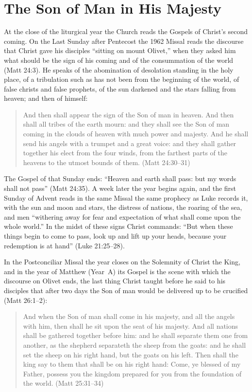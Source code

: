 \section{The Son of Man in His Majesty}\label{sec:majesty}

At the close of the liturgical year the Church reads the Gospels of Christ's second coming. On the Last Sunday after Pentecost the 1962 Missal reads the discourse that Christ gave his disciples ``sitting on mount Olivet,'' when they asked him what should be the sign of his coming and of the consummation of the world (Matt 24:3). He speaks of the abomination of desolation standing in the holy place, of a tribulation such as has not been from the beginning of the world, of false christs and false prophets, of the sun darkened and the stars falling from heaven; and then of himself:

\begin{quote}
And then shall appear the sign of the Son of man in heaven. And then shall all tribes of the earth mourn: and they shall see the Son of man coming in the clouds of heaven with much power and majesty. And he shall send his angels with a trumpet and a great voice: and they shall gather together his elect from the four winds, from the farthest parts of the heavens to the utmost bounds of them. (Matt 24:30--31)
\end{quote}

The Gospel of that Sunday ends: ``Heaven and earth shall pass: but my words shall not pass'' (Matt 24:35). A week later the year begins again, and the first Sunday of Advent reads in the same Missal the same prophecy as Luke records it, with the sun and moon and stars, the distress of nations, the roaring of the sea, and men ``withering away for fear and expectation of what shall come upon the whole world.'' In the midst of these signs Christ commands: ``But when these things begin to come to pass, look up and lift up your heads, because your redemption is at hand'' (Luke 21:25--28).

In the Postconciliar Missal the year closes on the Solemnity of Christ the King, and in the year of Matthew (Year~A) its Gospel is the scene with which the discourse on Olivet ends, the last thing Christ taught before he said to his disciples that after two days the Son of man would be delivered up to be crucified (Matt 26:1--2):

\begin{quote}
And when the Son of man shall come in his majesty, and all the angels with him, then shall he sit upon the seat of his majesty. And all nations shall be gathered together before him: and he shall separate them one from another, as the shepherd separateth the sheep from the goats: and he shall set the sheep on his right hand, but the goats on his left. Then shall the king say to them that shall be on his right hand: Come, ye blessed of my Father, possess you the kingdom prepared for you from the foundation of the world. (Matt 25:31--34)
\end{quote}

